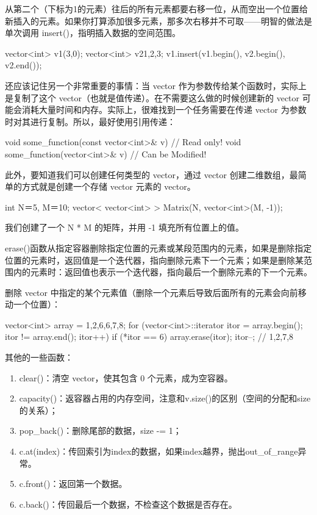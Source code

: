 从第二个（下标为1的元素）往后的所有元素都要右移一位，从而空出一个位置给新插入的元素。如果你打算添加很多元素，那多次右移并不可取——明智的做法是单次调用 insert()，指明插入数据的空间范围。

\begin{Code}
vector<int> v1(3,0);
vector<int> v2{1,2,3};
v1.insert(v1.begin(), v2.begin(), v2.end());
\end{Code}

还应该记住另一个非常重要的事情：当 vector 作为参数传给某个函数时，实际上是复制了这个 vector（也就是值传递）。在不需要这么做的时候创建新的 vector 可能会消耗大量时间和内存。实际上，很难找到一个任务需要在传递 vector 为参数时对其进行复制。所以，最好使用引用传递：

\begin{Code}
void some_function(const vector<int>& v) { 
	// Read only!
}
void some_function(vector<int>& v) { 
	// Can be Modified!
}
\end{Code}
此外，要知道我们可以创建任何类型的 vector，通过 vector 创建二维数组，最简单的方式就是创建一个存储 vector 元素的 vector。
\begin{Code}
int N＝5, M＝10;
vector< vector<int> > Matrix(N, vector<int>(M, -1));
\end{Code}
我们创建了一个 N * M 的矩阵，并用 -1 填充所有位置上的值。

erase()函数从指定容器删除指定位置的元素或某段范围内的元素，如果是删除指定位置的元素时，返回值是一个迭代器，指向删除元素下一个元素；如果是删除某范围内的元素时：返回值也表示一个迭代器，指向最后一个删除元素的下一个元素。

删除 vector 中指定的某个元素值（删除一个元素后导致后面所有的元素会向前移动一个位置）：
\begin{Code}
vector<int> array = {1,2,6,6,7,8};
for (vector<int>::iterator itor = array.begin(); itor != array.end(); itor++)
{
	if (*itor == 6) {
		array.erase(itor);
		itor--;
	}
}
// 1,2,7,8
\end{Code}
其他的一些函数：
\begin{enumerate}
	\item   clear()：清空 vector，使其包含 0 个元素，成为空容器。
	\item   capacity()：返容器占用的内存空间，注意和v.size()的区别（空间的分配和size的关系）；
	\item   pop_back()：删除尾部的数据，size -= 1；
	\item   c.at(index)：传回索引为index的数据，如果index越界，抛出out_of_range异常。
	\item   c.front()：返回第一个数据。
	\item   c.back()：传回最后一个数据，不检查这个数据是否存在。
\end{enumerate}


